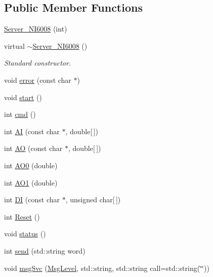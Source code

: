 \subsection*{Public Member Functions}
\begin{DoxyCompactItemize}
\item 
\hyperlink{classServer__NI6008_afdb7ded0c7463c53829529aa9864c9da}{Server\+\_\+\+N\+I6008} (int)
\item 
virtual \hyperlink{classServer__NI6008_a1c9bf761d7bae3ee267363fb851171b7}{$\sim$\+Server\+\_\+\+N\+I6008} ()
\begin{DoxyCompactList}\small\item\em Standard constructor. \end{DoxyCompactList}\item 
void \hyperlink{classServer__NI6008_a7bcfa6ba683c63b68c624644ccfb8597}{error} (const char $\ast$)
\item 
void \hyperlink{classServer__NI6008_ae3ac1bbf922a2475f41dfd97482af152}{start} ()
\item 
int \hyperlink{classServer__NI6008_ac659132ba000bf628a5f5b696ae133ee}{cmd} ()
\item 
int \hyperlink{classServer__NI6008_a94705879717d5bcf129899e96be81675}{AI} (const char $\ast$, double\mbox{[}$\,$\mbox{]})
\item 
int \hyperlink{classServer__NI6008_adde2efeb68363f67abb6d76c7ca2d761}{AO} (const char $\ast$, double\mbox{[}$\,$\mbox{]})
\item 
int \hyperlink{classServer__NI6008_a53ef808ed00d7b7105b62c2ce34faaec}{A\+O0} (double)
\item 
int \hyperlink{classServer__NI6008_a130bb6bca52d5c779491c51975e6ffda}{A\+O1} (double)
\item 
int \hyperlink{classServer__NI6008_a76b7491d11244e43a2fdb6d4783bd0f8}{DI} (const char $\ast$, unsigned char\mbox{[}$\,$\mbox{]})
\item 
int \hyperlink{classServer__NI6008_a0495ec12779e4b9bfdda3d60c0ef20aa}{Reset} ()
\item 
void \hyperlink{classServer__NI6008_aae0469228b36fc7085223ad301ffe073}{status} ()
\item 
int \hyperlink{classServer__NI6008_af47694911afff2feb37a091d9fcab4fa}{send} (std\+::string word)
\item 
void \hyperlink{classServer__NI6008_a140d5f91d6c0f4fb963ecf747e44df78}{msg\+Svc} (\hyperlink{classServer__NI6008_af1e3e3bac26355a746b5d2e548fe25be}{Msg\+Level}, std\+::string, std\+::string call=std\+::string(\char`\"{}\char`\"{}))

\end{DoxyCompactItemize}
